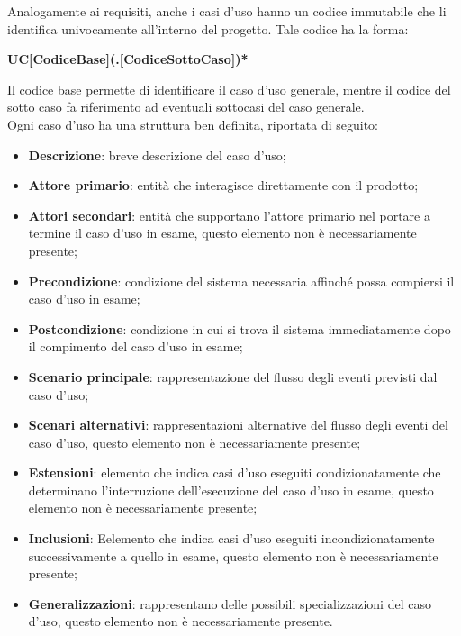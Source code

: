 Analogamente ai requisiti, anche i casi d'uso hanno un codice immutabile che li identifica univocamente all'interno del progetto. Tale codice ha la forma:
\begin{center}
    \textbf{UC[CodiceBase](.[CodiceSottoCaso])*}
\end{center}
Il codice base permette di identificare il caso d'uso generale, mentre il codice del sotto caso fa riferimento ad eventuali sottocasi del caso generale.\\
Ogni caso d'uso ha una struttura ben definita, riportata di seguito:
\begin{itemize}
    \item \textbf{Descrizione}: breve descrizione del caso d'uso;
    \item \textbf{Attore primario}: entità che interagisce direttamente con il prodotto;
    \item \textbf{Attori secondari}: entità che supportano l'attore primario nel portare a termine il caso d'uso in
    esame, questo elemento non è necessariamente presente;
    \item \textbf{Precondizione}: condizione del sistema necessaria affinché possa compiersi il caso d'uso in esame;
    \item \textbf{Postcondizione}: condizione in cui si trova il sistema immediatamente dopo il compimento del caso
    d'uso in esame;
    \item \textbf{Scenario principale}: rappresentazione del flusso degli eventi previsti dal caso d'uso;
    \item \textbf{Scenari alternativi}: rappresentazioni alternative del flusso degli eventi del caso d'uso, questo
    elemento non è necessariamente presente;
    \item \textbf{Estensioni}: elemento che indica casi d'uso eseguiti condizionatamente che determinano l'interruzione
    dell'esecuzione del caso d'uso in esame, questo elemento non è necessariamente presente;
    \item \textbf{Inclusioni}: Eelemento che indica casi d'uso eseguiti incondizionatamente successivamente a quello in
    esame, questo elemento non è necessariamente presente;
    \item \textbf{Generalizzazioni}: rappresentano delle possibili specializzazioni del caso d'uso, questo elemento non è necessariamente presente.
\end{itemize}

